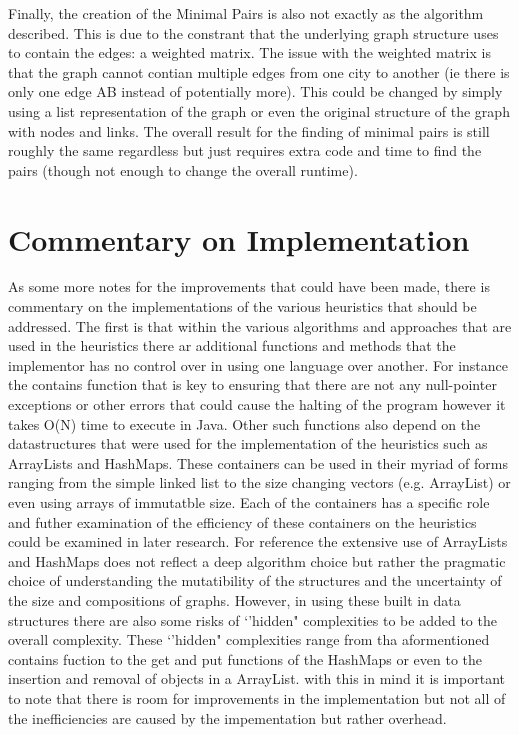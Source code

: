 \documentclass[midd]{thesis}
\newcommand{\tab}{\hspace*{2em}}
\begin{document}
\tab Finally, the creation of the Minimal Pairs is also not exactly as the algorithm described. This is due to the constrant that the underlying graph structure uses to contain the edges: a weighted matrix. The issue with the weighted matrix is that the graph cannot contian multiple edges from one city to another (ie there is only one edge AB instead of potentially more). This could be changed by simply using a list representation of the graph or even the original structure of the graph with nodes and links. The overall result for the finding of minimal pairs is still roughly the same regardless but just requires extra code and time to find the pairs (though not enough to change the overall runtime).\\
\section{Commentary on Implementation}
\tab As some more notes for the improvements that could have been made, there is commentary on the implementations of the various heuristics that should be addressed. The first is that within the various algorithms and approaches that are used in the heuristics there ar additional functions and methods that the implementor has no control over in using one language over another. For instance the contains function that is key to ensuring that there are not any null-pointer exceptions or other errors that could cause the halting of the program however it takes O(N) time to execute in Java. Other such functions also depend on the datastructures that were used for the implementation of the heuristics such as ArrayLists and HashMaps. These containers can be used in their myriad of forms ranging from the simple linked list to the size changing vectors (e.g. ArrayList) or even using arrays of immutatble size. Each of the containers has a specific role and futher examination of the efficiency of these containers on the heuristics could be examined in later research. For reference the extensive use of ArrayLists and HashMaps does not reflect a deep algorithm choice but rather the pragmatic choice of understanding the mutatibility of the structures and the uncertainty of the size and compositions of graphs. However, in using these built in data structures there are also some risks of `'hidden" complexities to be added to the overall complexity. These `'hidden" complexities range from tha aformentioned contains fuction to the get and put functions of the HashMaps or even to the insertion and removal of objects in a ArrayList. with this in mind it is important to note that there is room for improvements in the implementation but not all of the inefficiencies are caused by the impementation but rather overhead.\\
\end{document}
